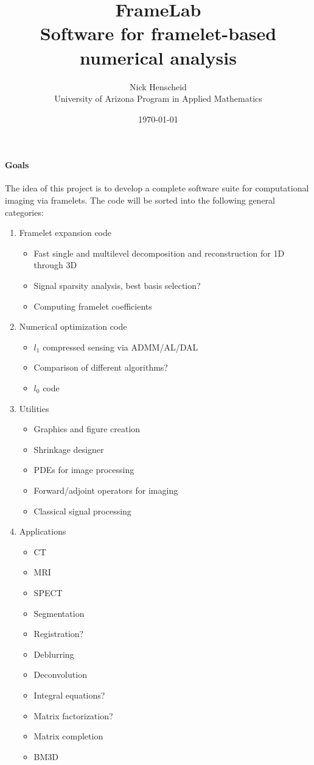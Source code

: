 \documentclass[12pt]{article}
\begin{document}
\title{FrameLab\\\small{Software for framelet-based numerical analysis}}
\author{Nick Henscheid\\\small{ University of Arizona Program in Applied Mathematics}}
\date{\today}
\maketitle

\paragraph{Goals}
The idea of this project is to develop a complete software suite for computational imaging via framelets.  The code will be sorted into the following general categories: 

\begin{enumerate}
\item Framelet expansion code 
\begin{itemize}
\item Fast single and multilevel decomposition and reconstruction for 1D through 3D
\item Signal sparsity analysis, best basis selection?
\item Computing framelet coefficients 
\end{itemize}
\item Numerical optimization code 
\begin{itemize}
\item $l_1$ compressed sensing via ADMM/AL/DAL 
\item Comparison of different algorithms?
\item $l_0$ code 
\end{itemize}
\item Utilities 
\begin{itemize}
\item Graphics and figure creation 
\item Shrinkage designer 
\item PDEs for image processing
\item Forward/adjoint operators for imaging 
\item Classical signal processing 
\end{itemize}
\item Applications 
\begin{itemize}
\item CT 
\item MRI 
\item SPECT 
\item Segmentation 
\item Registration? 
\item Deblurring 
\item Deconvolution 
\item Integral equations?
\item Matrix factorization?
\item Matrix completion 
\item BM3D
\end{itemize}
\end{enumerate}
\end{document}
